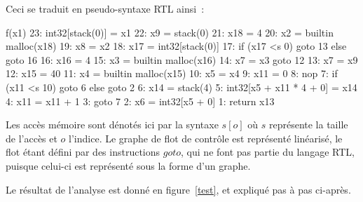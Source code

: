 \documentclass{article}
\begin{document}
\newpage

Ceci se traduit en pseudo-syntaxe RTL ainsi~:

\begin{cc}
f(x1) {
    23: int32[stack(0)] = x1
    22: x9 = stack(0)
    21: x18 = 4
    20: x2 = builtin malloc(x18)
    19: x8 = x2
    18: x17 = int32[stack(0)]
    17: if (x17 <s 0) goto 13 else goto 16
    16: x16 = 4
    15: x3 = builtin malloc(x16)
    14: x7 = x3
        goto 12
    13: x7 = x9
    12: x15 = 40
    11: x4 = builtin malloc(x15)
    10: x5 = x4
    9: x11 = 0
    8: nop
    7: if (x11 <s 10) goto 6 else goto 2
    6: x14 = stack(4)
    5: int32[x5 + x11 * 4 + 0] = x14
    4: x11 = x11 + 1
    3: goto 7
    2: x6 = int32[x5 + 0]
    1: return x13
}
\end{cc}

Les accès mémoire sont dénotés ici par la syntaxe $s[o]$ où
$s$ représente la taille de l'accès et $o$ l'indice. Le
graphe de flot de contrôle est représenté linéarisé, le flot étant défini par
des instructions $goto$, qui ne font pas partie du langage RTL,
puisque celui-ci est représenté sous la forme d'un graphe.

Le résultat de l'analyse est donné en figure~\ref{test}, et expliqué pas à pas
ci-après.
\end{document}
